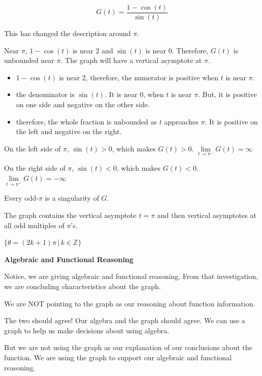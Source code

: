 \documentclass{ximera}
\begin{document}
\[    G(t) = \frac{1-\cos(t)}{\sin(t)}  \]



This has changed the description around $\pi$. 

Near $\pi$, $1-\cos(t)$ is near $2$ and $\sin(t)$ is near $0$.  Therefore, $G(t)$ is unbounded near $\pi$.  The graph will have a vertical asymptote at $\pi$.


\begin{itemize}
\item $1-\cos(t)$ is near $2$, therefore, the numerator is positive when $t$ is near $\pi$.
\item the denominator is $\sin(t)$. It is near $0$, when $t$ is near $\pi$. But, it is positive on one side and negative on the other side.
\item therefore, the whole fraction is unbounded as $t$ approaches $\pi$.  It is positive on the left and negative on the right.
\end{itemize}




On the left side of $\pi$, $\sin(t) > 0$, which makes $G(t) > 0$.   $\lim\limits_{t \to \pi^{-}}G(t) = \infty$ 

On the right side of $\pi$, $\sin(t) < 0$, which makes $G(t) < 0$.   $\lim\limits_{t \to \pi^{+}}G(t) = -\infty$ 








Every odd-$\pi$ is a singularity of $G$.


The graph contains the vertical asymptote $t=\pi$ and then vertical asymptotes at all odd multiples of $\pi$'s. 




$\{  \theta = (2k+1) \pi \, | \, k \in \mathbb{Z}   \}$




\begin{warning} \textbf{\textcolor{red!80!black}{Algebraic and Functional Reasoning}}


Notice, we are giving algebraic and functional reasoning.  From that investigation, we are concluding characteristics about the graph. 

We are NOT pointing to the graph as our reasoning about function information. 


The two should agree!  Our algebra and the graph should agree.  We can use a graph to help us make decisions about using algebra.

But we are not using the graph as our explanation of our conclusions about the function.  We are using the graph to support our algebraic and functional reasoning.


\end{warning}
\end{document}
